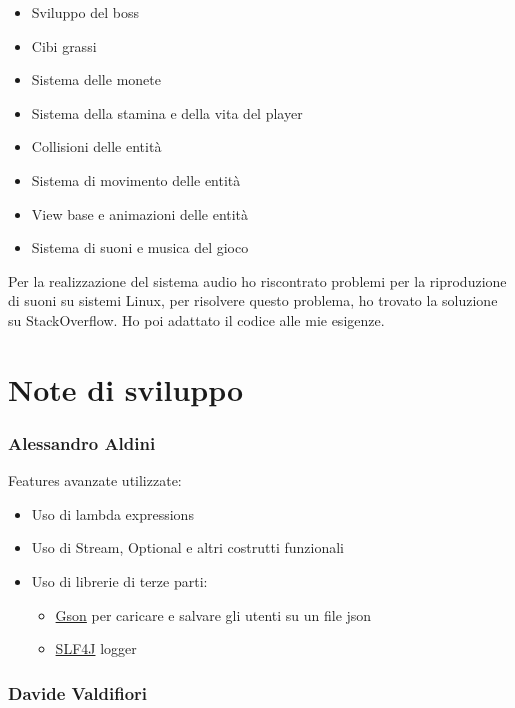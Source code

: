 \documentclass[a4paper,12pt]{report}
\begin{document}
\begin{itemize}
    \item Sviluppo del boss
    \item Cibi grassi
    \item Sistema delle monete
    \item Sistema della stamina e della vita del player
    \item Collisioni delle entità
    \item Sistema di movimento delle entità
    \item View base e animazioni delle entità
    \item Sistema di suoni e musica del gioco
\end{itemize}

Per la realizzazione del sistema audio ho riscontrato problemi per la riproduzione di suoni su sistemi Linux, per risolvere questo problema, ho trovato la soluzione su StackOverflow. Ho poi adattato il codice alle mie esigenze.

\section{Note di sviluppo}

\subsubsection{Alessandro Aldini}

Features avanzate utilizzate:

\begin{itemize}
    \item Uso di lambda expressions
    \item Uso di Stream, Optional e altri costrutti funzionali
    \item Uso di librerie di terze parti:
    \begin{itemize}
        \item \href{https://github.com/google/gson}{Gson} per caricare e salvare gli utenti su un file json
        \item \href{https://github.com/qos-ch/slf4j}{SLF4J} logger
    \end{itemize}
\end{itemize}

\subsubsection{Davide Valdifiori}
\end{document}
